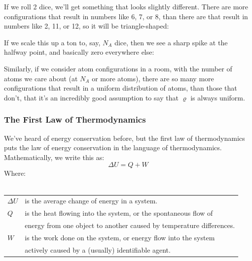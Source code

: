 \documentclass[a4paper]{article}
\begin{document}
If we roll 2 dice, we'll get something that looks slightly different. There are
more configurations that result in numbers like 6, 7, or 8, than there are that
result in numbers like 2, 11, or 12, so it will be triangle-shaped:
\begin{center}
\end{center}
If we scale this up a ton to, say, $N_A$ dice, then we see a sharp spike
at the halfway point, and basically zero everywhere else:
\begin{center}
\end{center}

Similarly, if we consider atom configurations in a room, with the number
of atoms we care about (at $N_A$ or more atoms), there are so many more
configurations that result in a uniform distribution of atoms, than those that
don't, that it's an incredibly good assumption to say that $\varrho$ is always
uniform.


\subsubsection{The First Law of Thermodynamics}
We've heard of energy conservation before, but the first law of thermodynamics
puts the law of energy conservation in the language of thermodynamics.
Mathematically, we write this as:
\[ \Delta U = Q + W \]
Where:\\~\\
\begin{tabular}{ll}
	$\Delta U$& is the average change of energy in a system.\\
	$Q$ & is the heat flowing into the system, or the spontaneous flow of\\
	&energy	from one object to another caused by temperature differences.
	\\
	$W$ & is the work done on the system, or energy flow into the system\\
	&actively caused by a (usually) identifiable agent.
\end{tabular}
\end{document}

